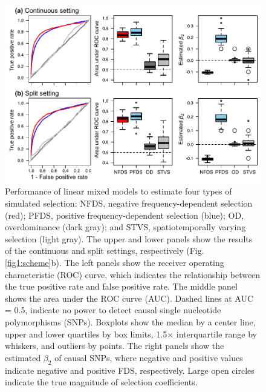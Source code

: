 \documentclass[12pt,]{article}
\begin{document}
\begin{figure}[]
  \includegraphics[width=\linewidth]{beta2LMMdomi.pdf}
  \caption{Performance of linear mixed models to estimate four types of simulated selection: NFDS, negative frequency-dependent selection (red); PFDS, positive frequency-dependent selection (blue); OD, overdominance (dark gray); and STVS, spatiotemporally varying selection (light gray). The upper and lower panels show the results of the continuous and split settings, respectively (Fig. \ref{fig1:scheme}b). The left panels show the receiver operating characteristic (ROC) curve, which indicates the relationship between the true positive rate and false positive rate. The middle panel shows the area under the ROC curve (AUC). Dashed lines at AUC = 0.5, indicate no power to detect causal single nucleotide polymorphisms (SNPs). Boxplots show the median by a center line, upper and lower quartiles by box limits, 1.5$\times$ interquartile range by whiskers, and outliers by points. The right panels show the estimated $\beta_2$ of causal SNPs, where negative and positive values indicate negative and positive FDS, respectively. Large open circles indicate the true magnitude of selection coefficients.}
  \label{fig3:beta2LMM}
\end{figure}
\end{document}
